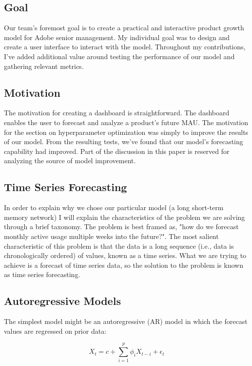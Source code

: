 \documentclass[11pt, oneside, authoryear]{report}
\begin{document}
\subsection{Goal}
Our team's foremost goal is to create a practical and interactive product growth model for Adobe senior management. My individual goal was to design and create a user interface to interact with the model. Throughout my contributions, I've added additional value around testing the performance of our model and gathering relevant metrics.

\subsection{Motivation}
The motivation for creating a dashboard is straightforward. The dashboard enables the user to forecast and analyze a product's future MAU.
The motivation for the section on hyperparameter optimization was simply to improve the results of our model. From the resulting tests, we've found that our model's forecasting capability had improved. Part of the discussion in this paper is reserved for analyzing the source of model improvement.

\subsection{Time Series Forecasting}

In order to explain why we chose our particular model (a long short-term memory network) I will explain the characteristics of the problem we are solving through a brief taxonomy. The problem is best framed as, "how do we forecast monthly active usage multiple weeks into the future?". The most salient characteristic of this problem is that the data is a long sequence (i.e., data is chronologically ordered) of values, known as a time series. What we are trying to achieve is a forecast of time series data, so the solution to the problem is known as time series forecasting.

\subsection{Autoregressive Models}

The simplest model might be an autoregressive (AR) model in which the forecast values are regressed on prior data:

\begin{equation}
  \label{eq:1}
  X_t = c + \sum_{i=1}^p \phi_i X_{t-i} + \epsilon_t
\end{equation}
\end{document}
